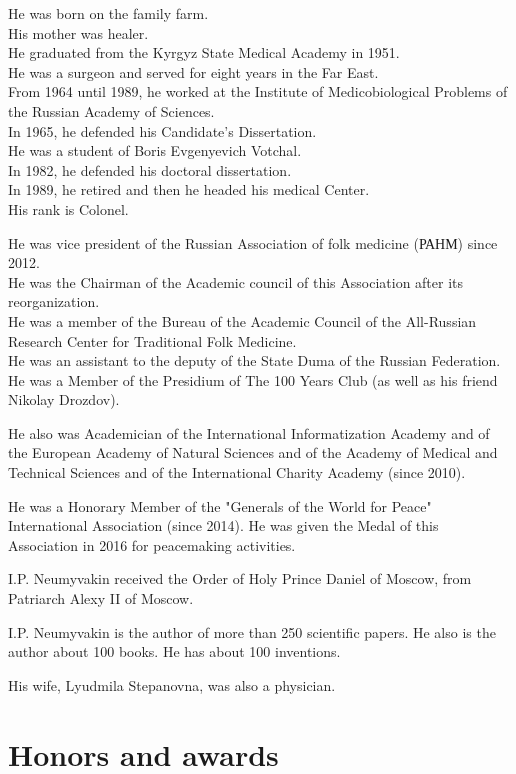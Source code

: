 He was born on the family farm.\\
His mother was healer.\\
He graduated from the Kyrgyz State Medical Academy in 1951.\\
He was a surgeon and served for eight years in the Far East.\\
From 1964 until 1989, he worked at the Institute of Medicobiological
Problems of the Russian Academy of Sciences.\\
In 1965, he defended his Candidate's Dissertation.\\
He was a student of Boris Evgenyevich Votchal.\\
In 1982, he defended his doctoral dissertation.\\
In 1989, he retired and then he headed his medical Center.\\
His rank is Colonel.

He was vice president of the Russian Association of folk medicine (РАНМ)
since 2012.\\
He was the Chairman of the Academic council of this Association after
its reorganization.\\
He was a member of the Bureau of the Academic Council of the All-Russian
Research Center for Traditional Folk Medicine.\\
He was an assistant to the deputy of the State Duma of the Russian
Federation.\\
He was a Member of the Presidium of The 100 Years Club (as well as his
friend Nikolay Drozdov).

He also was Academician of the International Informatization Academy and
of the European Academy of Natural Sciences and of the Academy of
Medical and Technical Sciences and of the International Charity Academy
(since 2010).

He was a Honorary Member of the "Generals of the World for Peace"
International Association (since 2014). He was given the Medal of this
Association in 2016 for peacemaking activities.

I.P. Neumyvakin received the Order of Holy Prince Daniel of Moscow, from
Patriarch Alexy II of Moscow.

I.P. Neumyvakin is the author of more than 250 scientific papers. He
also is the author about 100 books. He has about 100 inventions.

His wife, Lyudmila Stepanovna, was also a physician.

\section{Honors and awards}\label{honors-and-awards}

